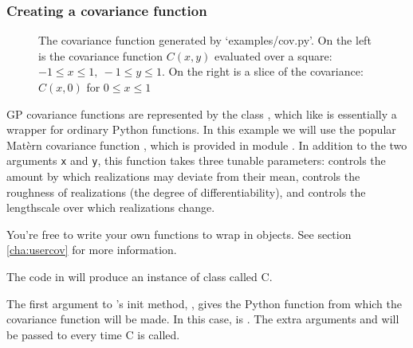 \subsubsection{Creating a covariance function}\label{subsub:cov}
\begin{figure}
    \centering
    \caption{The covariance function generated by {\sffamily `examples/cov.py'}. On the left is the covariance function $C(x,y)$ evaluated over a square: $-1\le x\le 1,\ -1\le y\le 1$. On the right is a slice of the covariance: $C(x,0)$ for $0\le x \le 1$}
    \label{fig:cov}
\end{figure}

GP covariance functions are represented by the class , which like  is essentially a wrapper for ordinary Python functions. In this example we will use the popular Mat\`ern covariance function \cite{banerjee}, which is provided in module . In addition to the two arguments \texttt{x} and \texttt{y}, this function takes three tunable parameters:  controls the amount by which realizations may deviate from their mean,  controls the roughness of realizations (the degree of differentiability), and  controls the lengthscale over which realizations change.

You're free to write your own functions to wrap in  objects. See section \ref{cha:usercov} for more information.

The code in  will produce an instance of class  called C.


The first argument to 's init method, , gives the Python function from which the covariance function will be made. In this case,  is . The extra arguments  and  will be passed to  every time C is called.

